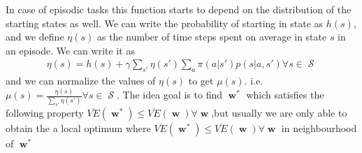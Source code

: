 \documentclass[twocolumn,11pt]{article}
\DeclareMathOperator{\w}{\textbf{w}}
\DeclareMathOperator{\state}{\mathcal{S}}
\begin{document}
In case of episodic tasks this function starts to depend on the distribution of the starting states as well.
We can write the  probability of starting in state as $h(s)$, and we  define $\eta(s)$  as the number  of time steps spent on average in state $s$ in an episode. We can write it as \useshortskip \begin{align*}
\eta(s) = h(s) +  \gamma \sum_{s'} \eta(s') \sum_a \pi(a|s') p(s|a, s')\forall s\in \state
\end{align*} and we  can normalize the values of $\eta(s)$ to get $\mu(s)$. i.e. $\mu(s)  = \tfrac{\eta(s)}{\sum_{s'}\eta(s')} \forall s \in \state$.  The idea goal is to find $\w^*$  which satisfies the following property $\overline{VE}(\w^*) \leq \overline{VE}(\w) \forall \w$,but usually we are only able to obtain the a local optimum where $\overline{VE}(\w^*) \leq \overline{VE}(\w) \forall \w $ in neighbourhood of $\w^*$
\end{document}
